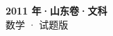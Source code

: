 \documentclass[zihao=-4, a4paper]{ctexart}
\begin{document}
\begin{center}
  {\Large\bfseries 2011 年·山东卷·文科}\\[4pt]
  {\large 数学 · 试题版}
\end{center}
\medskip
{}

\end{document}
